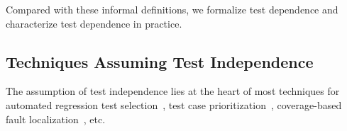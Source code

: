 Compared with these informal definitions,
we formalize test dependence and characterize 
test dependence in practice.



\subsection{Techniques Assuming Test Independence}

The assumption of test independence lies at the heart of most
techniques for automated regression test selection~\cite{harroldetal:OOPSLA:2001, Orso:2004:SRT,
Briand:2009:ART, Zhang:2012:RMT, Nanda:2011:RTP},
test case prioritization~\cite{Elbaum:2000:PTC:347324.348910, Kim:2002:HTP:581339.581357, Rummel:2005:TPR:1066677.1067016, Srivastava:2002:EPT:566172.566187, Jiang:2009:ART}, 
coverage-based fault localization~\cite{Steimann:2013, Zhang:2013:IMF, Jones:2002:VTI}, etc. 


